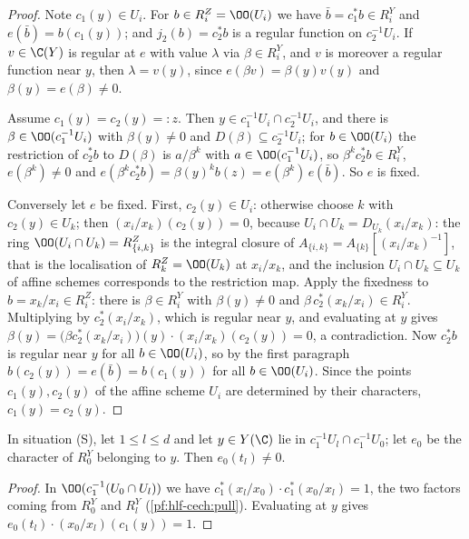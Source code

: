 \begin{proof}
Note $c_1(y)\in U_i$. For $b\in R^Z_i=\OO(U_i)$ we have $\bar b=c_1^*b\in R^Y_i$ and $e(\bar b)=b(c_1(y))$; and $j_2(b)=c_2^*b$ is a regular function
on $c_2^{-1}U_i$. If $v\in\C(Y)$ is regular at $e$ with value $\lambda$ via $\beta\in R^Y_i$, and $v$ is moreover a regular function near $y$, then
$\lambda=v(y)$, since $e(\beta v)=\beta(y)v(y)$ and $\beta(y)=e(\beta)\ne0$.

Assume $c_1(y)=c_2(y)=:z$. Then $y\in c_1^{-1}U_i\cap c_2^{-1}U_i$, and there is $\beta\in\OO(c_1^{-1}U_i)$ with $\beta(y)\ne0$ and
$D(\beta)\subseteq c_2^{-1}U_i$; for $b\in\OO(U_i)$ the restriction of $c_2^*b$ to $D(\beta)$ is $a/\beta^k$ with $a\in\OO(c_1^{-1}U_i)$, so $\beta^kc_2^*b\in
R^Y_i$, $e(\beta^k)\ne0$ and $e(\beta^kc_2^*b)=\beta(y)^kb(z)=e(\beta^k)\,e(\bar b)$. So $e$ is fixed.

Conversely let $e$ be fixed. First, $c_2(y)\in U_i$: otherwise choose $k$ with $c_2(y)\in U_k$; then $(x_i/x_k)(c_2(y))=0$, because $U_i\cap U_k=D_{U_k}(x_i/x_k)$: the
ring $\OO(U_i\cap U_k)=R^Z_{\{i,k\}}$ is the integral closure of $A_{\{i,k\}}=A_{\{k\}}[(x_i/x_k)^{-1}]$, that is the localisation of $R^Z_k=\OO(U_k)$ at
$x_i/x_k$, and the inclusion $U_i\cap U_k\subseteq U_k$ of affine schemes corresponds to the restriction map. Apply the fixedness to $b=x_k/x_i\in R^Z_i$: there is $\beta\in R^Y_i$ with $\beta(y)\ne0$ and
$\beta\,c_2^*(x_k/x_i)\in R^Y_i$. Multiplying by $c_2^*(x_i/x_k)$, which is regular near $y$, and evaluating at $y$ gives
$\beta(y)=\bigl(\beta c_2^*(x_k/x_i)\bigr)(y)\cdot(x_i/x_k)(c_2(y))=0$, a contradiction. Now $c_2^*b$ is regular near $y$ for all $b\in\OO(U_i)$, so by the
first paragraph $b(c_2(y))=e(\bar b)=b(c_1(y))$ for all $b\in\OO(U_i)$. Since the points $c_1(y),c_2(y)$ of the affine scheme $U_i$ are determined by
their characters, $c_1(y)=c_2(y)$.
\end{proof}

\begin{proposition}\label{pf:hlf-cech:noaway}
In situation (S), let $1\le l\le d$ and let $y\in Y(\C)$ lie in $c_1^{-1}U_l\cap c_1^{-1}U_0$; let $e_0$ be the character of $R^Y_0$ belonging to $y$. Then
$e_0(t_l)\ne0$.
\end{proposition}

\begin{proof}
In $\OO(c_1^{-1}(U_0\cap U_l))$ we have $c_1^*(x_l/x_0)\cdot c_1^*(x_0/x_l)=1$, the two factors coming from $R^Y_0$ and $R^Y_l$
(\cref{pf:hlf-cech:pull}). Evaluating at $y$ gives $e_0(t_l)\cdot(x_0/x_l)(c_1(y))=1$.
\end{proof}

